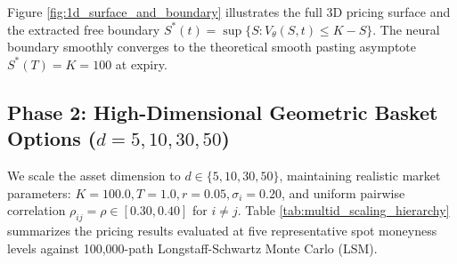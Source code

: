 \documentclass[11pt,a4paper]{article}
\begin{document}
Figure \ref{fig:1d_surface_and_boundary} illustrates the full 3D pricing surface and the extracted free boundary $S^*(t) = \sup\{S : V_\theta(S, t) \le K - S\}$. The neural boundary smoothly converges to the theoretical smooth pasting asymptote $S^*(T) = K = 100$ at expiry.

\subsection{Phase 2: High-Dimensional Geometric Basket Options \texorpdfstring{($d=5, 10, 30, 50$)}{(d=5, 10, 30, 50)}}
We scale the asset dimension to $d \in \{5, 10, 30, 50\}$, maintaining realistic market parameters: $K=100.0, T=1.0, r=0.05, \sigma_i=0.20$, and uniform pairwise correlation $\rho_{ij} = \rho \in [0.30, 0.40]$ for $i \ne j$. Table \ref{tab:multid_scaling_hierarchy} summarizes the pricing results evaluated at five representative spot moneyness levels against 100,000-path Longstaff-Schwartz Monte Carlo (LSM).
\end{document}

